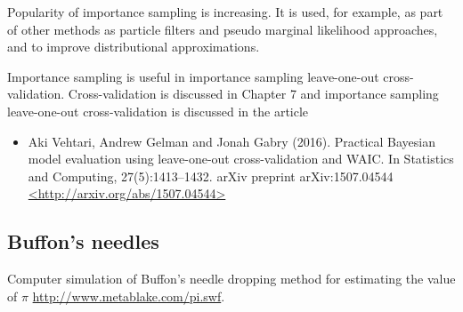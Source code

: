 \documentclass[a4paper,11pt,english]{article}
\begin{document}
 Popularity of importance sampling is increasing. It is used, for
 example, as part of other methods as particle filters and pseudo
 marginal likelihood approaches, and to improve distributional
 approximations.

 Importance sampling is useful in importance sampling leave-one-out
 cross-validation. Cross-validation is discussed in Chapter 7 and
 importance sampling leave-one-out cross-validation is discussed in
 the article
 \begin{itemize}
 \item Aki Vehtari, Andrew Gelman and Jonah Gabry (2016). Practical
   Bayesian model evaluation using leave-one-out cross-validation and
   WAIC. In Statistics and Computing, 27(5):1413--1432. arXiv preprint
   arXiv:1507.04544 \url{<http://arxiv.org/abs/1507.04544>}
 \end{itemize}

 \subsection*{Buffon's needles}

 Computer simulation of Buffon's needle dropping method for estimating
 the value of $\pi$ \url{http://www.metablake.com/pi.swf}. 

 
\end{document}
